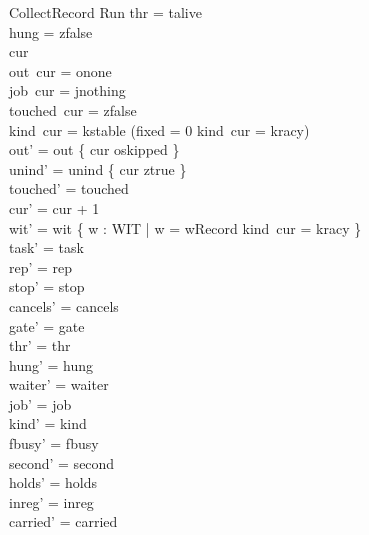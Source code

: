 \documentclass[a4paper,10pt,fleqn]{article}
\begin{document}
\begin{schema}{CollectRecord}
\Delta Run
\where
thr = talive \\
hung = zfalse \\
cur   \\
out~cur = onone \\
job~cur = jnothing \\
touched~cur = zfalse \\
kind~cur = kstable \lor (fixed = 0 \land kind~cur = kracy) \\
out' = out \oplus \{ cur \mapsto oskipped \} \\
unind' = unind \oplus \{ cur \mapsto ztrue \} \\
touched' = touched \\
cur' = cur + 1 \\
wit' = wit \cup \{ w : WIT | w = wRecord \land kind~cur = kracy \} \\
task' = task \\
rep' = rep \\
stop' = stop \\
cancels' = cancels \\
gate' = gate \\
thr' = thr \\
hung' = hung \\
waiter' = waiter \\
job' = job \\
kind' = kind \\
fbusy' = fbusy \\
second' = second \\
holds' = holds \\
inreg' = inreg \\
carried' = carried
\end{schema}
\end{document}
